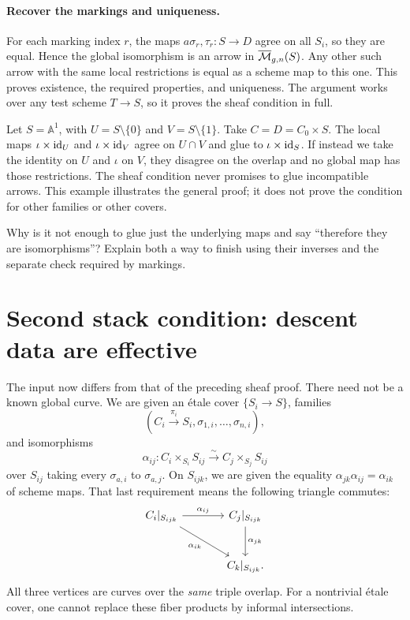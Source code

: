 \paragraph{Recover the markings and uniqueness.}
For each marking index $r$, the maps $a\sigma_r,\tau_r:S\to D$
agree on all $S_i$, so they are equal. Hence the global
isomorphism is an arrow in $\overline{\mathcal M}_{g,n}(S)$. Any other such arrow with
the same local restrictions is equal as a scheme map to this
one. This proves existence, the required properties, and
uniqueness. The argument works over any test scheme $T\to S$,
so it proves the sheaf condition in full.

\begin{Ex}
Let $S=\mathbb A^1$, with $U=S\setminus\{0\}$ and
$V=S\setminus\{1\}$. Take $C=D=C_0\times S$. The local maps
$\iota\times\operatorname{id}_U$ and $\iota\times\operatorname{id}_V$ agree on
$U\cap V$ and glue to $\iota\times\operatorname{id}_S$. If instead we take
the identity on $U$ and $\iota$ on $V$, they disagree on the
overlap and no global map has those restrictions. The sheaf
condition never promises to glue incompatible arrows. This
example illustrates the general proof; it does not prove the
condition for other families or other covers.
\end{Ex}

\begin{Ej}\label{ex:iso-sheaf}
Why is it not enough to glue just the underlying maps and say
``therefore they are isomorphisms''? Explain both a way to finish
using their inverses and the separate check required by markings.
\end{Ej}



\section{Second stack condition: descent data are effective}\label{sec:curve-descent}

The input now differs from that of the preceding sheaf proof.
There need not be a known global curve. We are given an \'etale
cover $\{S_i\to S\}$, families
\[
 (C_i\xrightarrow{\pi_i}S_i,\sigma_{1,i},\ldots,\sigma_{n,i}),
\]
and isomorphisms
\[
\alpha_{ij}:C_i\times_{S_i}S_{ij}
   \xrightarrow{\sim}C_j\times_{S_j}S_{ij}
\]
over $S_{ij}$ taking every $\sigma_{a,i}$ to $\sigma_{a,j}$.
On $S_{ijk}$, we are given the equality
$\alpha_{jk}\alpha_{ij}=\alpha_{ik}$ of scheme maps.
That last requirement means the following triangle commutes:
\[
\begin{tikzcd}[row sep=large,column sep=large]
C_i|_{S_{ijk}}\arrow[r,"\alpha_{ij}"]\arrow[dr,"\alpha_{ik}"']
 &C_j|_{S_{ijk}}\arrow[d,"\alpha_{jk}"]\\
 &C_k|_{S_{ijk}}.
\end{tikzcd}
\]
All three vertices are curves over the \emph{same} triple overlap.
For a nontrivial \'etale cover, one cannot replace these fiber
products by informal intersections.

